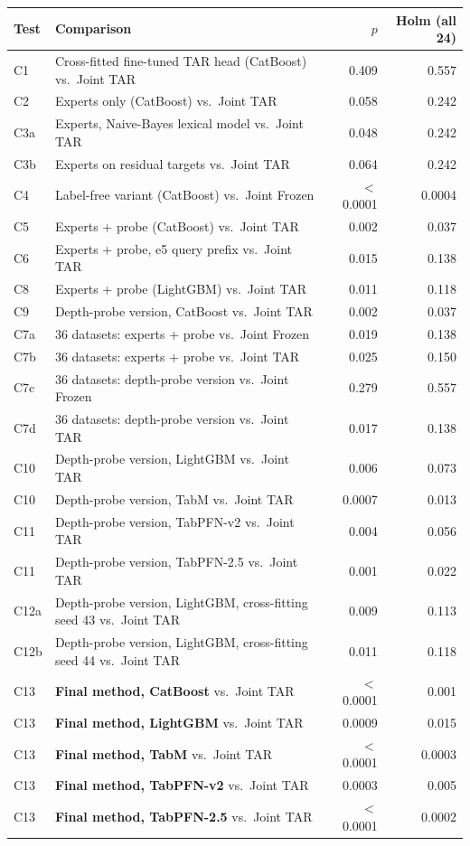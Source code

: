 \begin{tabular}{llrr}
\toprule
Test & Comparison & $p$ & Holm (all 24) \\
\midrule
C1 & Cross-fitted fine-tuned TAR head (CatBoost) vs.\ Joint TAR & 0.409 & 0.557 \\
C2 & Experts only (CatBoost) vs.\ Joint TAR & 0.058 & 0.242 \\
C3a & Experts, Naive-Bayes lexical model vs.\ Joint TAR & 0.048 & 0.242 \\
C3b & Experts on residual targets vs.\ Joint TAR & 0.064 & 0.242 \\
C4 & Label-free variant (CatBoost) vs.\ Joint Frozen & $<$0.0001 & 0.0004 \\
C5 & Experts + probe (CatBoost) vs.\ Joint TAR & 0.002 & 0.037 \\
C6 & Experts + probe, e5 query prefix vs.\ Joint TAR & 0.015 & 0.138 \\
C8 & Experts + probe (LightGBM) vs.\ Joint TAR & 0.011 & 0.118 \\
C9 & Depth-probe version, CatBoost vs.\ Joint TAR & 0.002 & 0.037 \\
C7a & 36 datasets: experts + probe vs.\ Joint Frozen & 0.019 & 0.138 \\
C7b & 36 datasets: experts + probe vs.\ Joint TAR & 0.025 & 0.150 \\
C7c & 36 datasets: depth-probe version vs.\ Joint Frozen & 0.279 & 0.557 \\
C7d & 36 datasets: depth-probe version vs.\ Joint TAR & 0.017 & 0.138 \\
C10 & Depth-probe version, LightGBM vs.\ Joint TAR & 0.006 & 0.073 \\
C10 & Depth-probe version, TabM vs.\ Joint TAR & 0.0007 & 0.013 \\
C11 & Depth-probe version, TabPFN-v2 vs.\ Joint TAR & 0.004 & 0.056 \\
C11 & Depth-probe version, TabPFN-2.5 vs.\ Joint TAR & 0.001 & 0.022 \\
C12a & Depth-probe version, LightGBM, cross-fitting seed 43 vs.\ Joint TAR & 0.009 & 0.113 \\
C12b & Depth-probe version, LightGBM, cross-fitting seed 44 vs.\ Joint TAR & 0.011 & 0.118 \\
C13 & \textbf{Final method, CatBoost} vs.\ Joint TAR & $<$0.0001 & 0.001 \\
C13 & \textbf{Final method, LightGBM} vs.\ Joint TAR & 0.0009 & 0.015 \\
C13 & \textbf{Final method, TabM} vs.\ Joint TAR & $<$0.0001 & 0.0003 \\
C13 & \textbf{Final method, TabPFN-v2} vs.\ Joint TAR & 0.0003 & 0.005 \\
C13 & \textbf{Final method, TabPFN-2.5} vs.\ Joint TAR & $<$0.0001 & 0.0002 \\
\bottomrule
\end{tabular}
